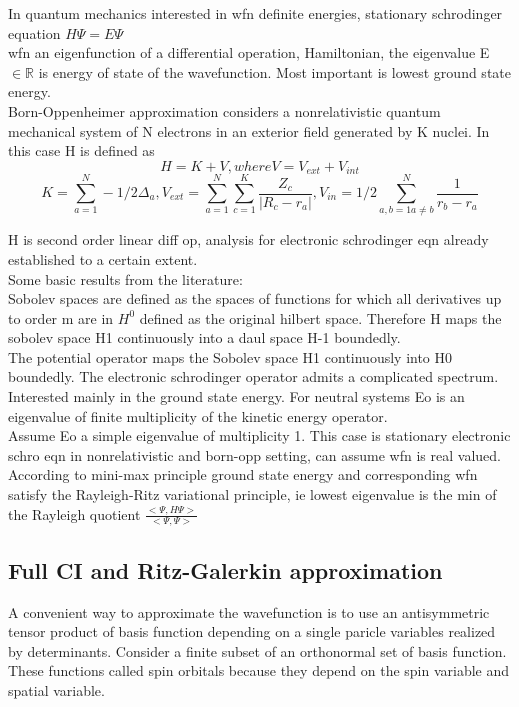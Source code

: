 \documentclass[10pt, draft]{article}
\begin{document}
  In quantum mechanics interested in wfn definite energies, stationary schrodinger equation $ H \Psi = E \Psi $ \\
  wfn an eigenfunction of a differential operation, Hamiltonian, the eigenvalue E $\in \mathbb{R}$ is energy of state of the wavefunction.  Most important is lowest ground state energy.  \\
  Born-Oppenheimer approximation considers a nonrelativistic quantum mechanical system of N electrons in an exterior field generated by K nuclei.  In this case H is defined as
  \[H = K + V , where V = V_{ext} + V_{int}\]
  \[K = \sum_{a=1}^N -1/2 \Delta_a,  V_{ext} = \sum_{a=1}^N \sum_{c=1}^K \frac{Z_c}{|R_c - r_a|}, V_{in} = 1/2\sum_{a,b=1 a\neq b}^N \frac{1}{r_b - r_a}\]
  
 H is second order linear diff op, analysis for electronic schrodinger eqn already established to a certain extent.  \\
 Some basic results from the literature:\\
 Sobolev spaces are defined as the spaces of functions for which all derivatives up to order m are in $H^0$ defined as the original hilbert space.  Therefore H maps the sobolev space H1 continuously into a daul space H-1 boundedly. \\
 The potential operator maps the Sobolev space H1 continuously into H0 boundedly.  The electronic schrodinger operator admits a complicated spectrum.  Interested mainly in the ground state energy. For neutral systems Eo is an eigenvalue of finite multiplicity of the kinetic energy operator.\\
 Assume Eo a simple eigenvalue of multiplicity 1.  This case is stationary electronic schro eqn in nonrelativistic and born-opp setting, can assume wfn is real valued. According to mini-max principle ground state energy and corresponding wfn satisfy the Rayleigh-Ritz variational principle, ie lowest eigenvalue is the min of the Rayleigh quotient $\frac{<\Psi, H\Psi>}{<\Psi, \Psi>}$\\
 
 \subsection{Full CI and Ritz-Galerkin approximation}
 
 A convenient way to approximate the wavefunction is to use an antisymmetric tensor product of basis function depending on a single paricle variables realized by determinants.  Consider a finite subset of an orthonormal set of basis function. These functions called spin orbitals because they depend on the spin variable and spatial variable.  \\
 
\end{document}
